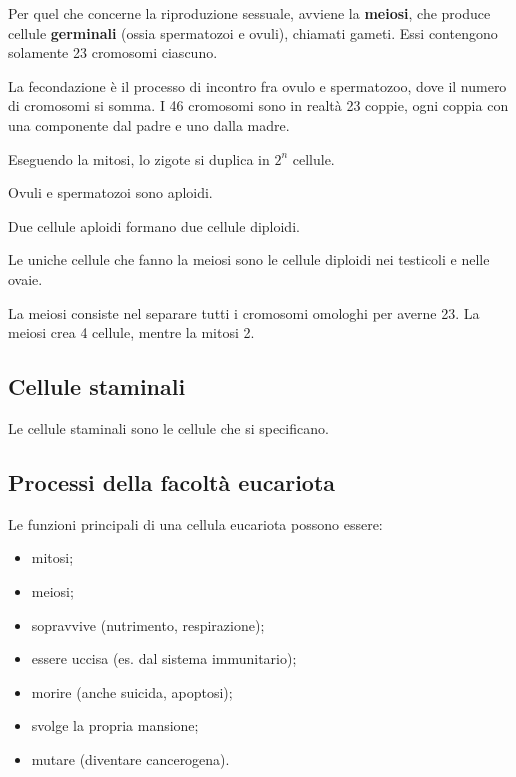 \documentclass[a4paper]{article}
\begin{document}
Per quel che concerne la riproduzione sessuale,
avviene la \textbf{meiosi}, che produce cellule \textbf{germinali}
(ossia spermatozoi e ovuli), chiamati gameti.
Essi contengono solamente 23 cromosomi ciascuno.

La fecondazione è il processo di incontro fra ovulo e spermatozoo,
dove il numero di cromosomi si somma.
I 46 cromosomi sono in realtà 23 coppie, ogni coppia con una componente dal padre e uno dalla madre.

Eseguendo la mitosi, lo zigote si duplica in \(2^n\) cellule.

Ovuli e spermatozoi sono aploidi.

Due cellule aploidi formano due cellule diploidi.

Le uniche cellule che fanno la meiosi sono le cellule diploidi nei testicoli e nelle ovaie.


La meiosi consiste nel separare tutti i cromosomi omologhi per averne 23.
La meiosi crea 4 cellule, mentre la mitosi 2.

\subsection{Cellule staminali}

Le cellule staminali sono le cellule che si specificano.

\subsection{Processi della facoltà eucariota}

Le funzioni principali di una cellula eucariota possono essere:

\begin{itemize}
    \item mitosi;
    \item meiosi;
    \item sopravvive (nutrimento, respirazione);
    \item essere uccisa (es. dal sistema immunitario);
    \item morire (anche suicida, apoptosi);
    \item svolge la propria mansione;
    \item mutare (diventare cancerogena).
\end{itemize}
\end{document}
